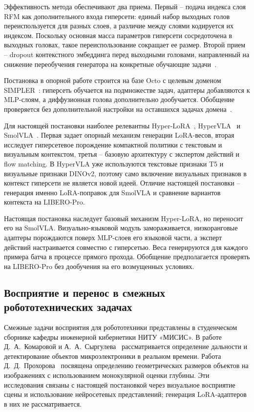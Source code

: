\documentclass{misisarticle}
\begin{document}
Эффективность метода обеспечивают два приема. Первый -- подача индекса слоя RFM как дополнительного входа гиперсети: единый набор выходных голов переиспользуется для разных слоев, а различие между слоями кодируется их индексом. Поскольку основная масса параметров гиперсети сосредоточена в выходных головах, такое переиспользование сокращает ее размер. Второй прием -- dropout контекстного эмбеддинга перед выходными головами, направленный на снижение переобучения генератора на конкретные обучающие задачи~\cite{hyperlora}.

Постановка в опорной работе строится на базе Octo с целевым доменом SIMPLER~\cite{simpler}: гиперсеть обучается на подмножестве задач, адаптеры добавляются к MLP-слоям, а диффузионная голова дополнительно дообучается. Обобщение проверяется без дополнительной настройки на оставшихся задачах домена~\cite{hyperlora}.

Для настоящей постановки наиболее релевантны Hyper-LoRA~\cite{hyperlora}, HyperVLA~\cite{hypervla} и SmolVLA~\cite{smolvla}. Первая задает опорный механизм генерации LoRA-весов, вторая исследует гиперсетевое порождение компактной политики с текстовым и визуальным контекстом, третья -- базовую архитектуру с экспертом действий и flow matching. В HyperVLA уже используются текстовые признаки T5 и визуальные признаки DINOv2, поэтому само включение визуальных признаков в контекст гиперсети не является новой идеей. Отличие настоящей постановки -- генерация именно LoRA-поправок для SmolVLA и сравнение вариантов контекста на LIBERO-Pro.

Настоящая постановка наследует базовый механизм Hyper-LoRA, но переносит его на SmolVLA. Визуально-языковой модуль замораживается, низкоранговые адаптеры порождаются поверх MLP-слоев его языковой части, а эксперт действий настраивается совместно с гиперсетью. Веса генерируются для каждого примера батча в процессе прямого прохода. Обобщение предполагается проверять на LIBERO-Pro без дообучения на его возмущенных условиях.

\subsection{Восприятие и перенос в смежных робототехнических задачах}

Смежные задачи восприятия для робототехники представлены в студенческом сборнике кафедры инженерной кибернетики НИТУ «МИСИС». В работе Д.~А.~Комаровой и А.~А.~Сыргулева~\cite{komarova} рассматривается определение дальности и детектирование объектов микроэлектроники в реальном времени. Работа Д.~Д.~Прохорова~\cite{prokhorov} посвящена определению геометрических размеров объектов на изображениях с использованием монокулярной оценки глубины. Эти исследования связаны с настоящей постановкой через визуальное восприятие сцены и использование нейросетевых представлений; генерация LoRA-адаптеров в них не рассматривается.
\end{document}
